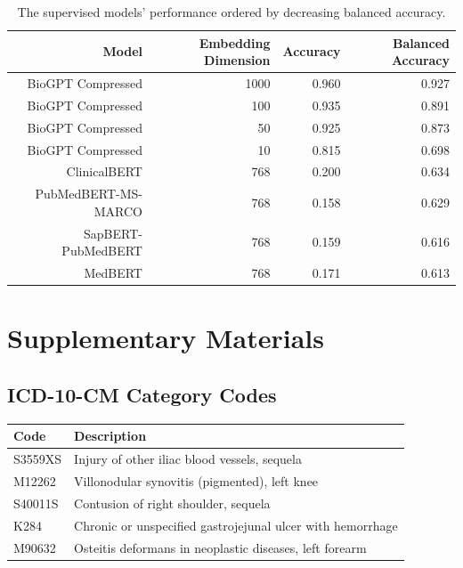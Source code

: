 \documentclass{bmcart}
\begin{document}
\begin{backmatter}
\begin{table}[ht!]
\caption{The supervised models' performance ordered by decreasing balanced accuracy.}
\label{tab:sup_perf}
\begin{tabular}{|r|r|r|r|}
\hline
Model & Embedding Dimension & Accuracy & Balanced Accuracy\\
\hline
BioGPT Compressed & 1000 & 0.960 & 0.927\\
\hline
BioGPT Compressed & 100 & 0.935 & 0.891\\
\hline
BioGPT Compressed & 50 & 0.925 & 0.873\\
\hline
BioGPT Compressed & 10 & 0.815 & 0.698\\
\hline
ClinicalBERT & 768 & 0.200 & 0.634 \\
\hline
PubMedBERT-MS-MARCO & 768 & 0.158 & 0.629\\
\hline
SapBERT-PubMedBERT & 768 & 0.159 & 0.616\\
\hline
MedBERT & 768 & 0.171 & 0.613\\
\hline
\end{tabular}
\end{table}


\pagebreak

\section*{Supplementary Materials}

\subsection{ICD-10-CM Category Codes}

\begin{table}[h]
\begin{tabular}{l|l|}
\hline
Code & Description\\
\hline
S3559XS & Injury of other iliac blood vessels, sequela\\
\hline
M12262 & Villonodular synovitis (pigmented), left knee\\
\hline
S40011S & Contusion of right shoulder, sequela\\
\hline
K284 & Chronic or unspecified gastrojejunal ulcer with hemorrhage\\
\hline
M90632 & Osteitis deformans in neoplastic diseases, left forearm\\
\hline
\end{tabular}
\end{table}


\end{backmatter}
\end{document}
